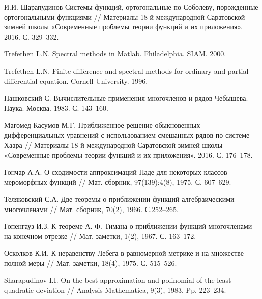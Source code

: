 \begin{thebibliography}{99}
И.И. Шарапудинов
Системы функций, ортогональные по Соболеву, порожденные ортогональными функциями
// Материалы 18-й международной Саратовской зимней школы «Современные проблемы теории функций и их приложения». 2016. С. 329--332.



{Trefethen  L.N.} Spectral methods in Matlab. Fhiladelphia. SIAM. 2000.



{Trefethen  L.N.}
Finite difference and spectral methods for ordinary and partial differential equation. Cornell University. 1996.



{Пашковский С.} Вычислительные применения многочленов и рядов Чебышева. Наука. Москва. 1983. С. 143--160.



{Магомед-Касумов М.Г.}
Приближенное решение обыкновенных дифференциальных уравнений с использованием смешанных рядов по системе Хаара
// Материалы 18-й международной Саратовской зимней школы «Современные проблемы теории функций и их приложения». 2016. С. 176--178.



{Гончар А.А.}
О сходимости аппроксимаций Паде для некоторых классов мероморфных функций
// Мат. сборник, 97(139):4(8), 1975. С. 607--629.



{Теляковский С.А.}
Две теоремы о приближении функций алгебраическими многочленами
// Мат. сборник, 70(2), 1966. С.252--265.



{Гопенгауз И.З.}
К теореме А. Ф. Тимана о приближении функций многочленами на конечном отрезке
// Мат. заметки, 1(2), 1967. С. 163--172.



{Осколков К.И.}
К неравенству Лебега в равномерной метрике и на множестве полной меры
// Мат.  заметки, 18(4), 1975. С. 515--526.



{Sharapudinov I.I.}
On the best approximation and polinomial of the least quadratic deviation
// Analysis Mathematica, 9(3), 1983. Pp. 223--234.




\end{thebibliography}
